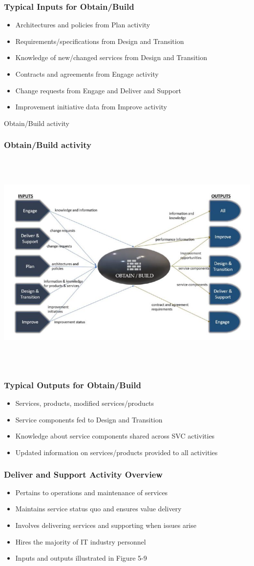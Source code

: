 \documentclass[aspectratio=169, table]{beamer}
\begin{document}
\begin{frame}
	\frametitle{Typical Inputs for Obtain/Build}
	\begin{itemize}
		\item Architectures and policies from Plan activity
		\item Requirements/specifications from Design and Transition
		\item Knowledge of new/changed services from Design and Transition
		\item Contracts and agreements from Engage activity
		\item Change requests from Engage and Deliver and Support
		\item Improvement initiative data from Improve activity
	\end{itemize}
\end{frame}

\begin{frame}{Obtain/Build activity} 	 \frametitle{Obtain/Build activity } \begin{center} 	\includegraphics[width=0.6\linewidth]{images/image-07.png} \end{center} \end{frame}

\begin{frame}
	\frametitle{Typical Outputs for Obtain/Build}
	\begin{itemize}
		\item Services, products, modified services/products
		\item Service components fed to Design and Transition
		\item Knowledge about service components shared across SVC activities
		\item Updated information on services/products provided to all activities
	\end{itemize}
\end{frame}

\begin{frame}
	\frametitle{Deliver and Support Activity Overview}
	\begin{itemize}
		\item Pertains to operations and maintenance of services
		\item Maintains service status quo and ensures value delivery
		\item Involves delivering services and supporting when issues arise
		\item Hires the majority of IT industry personnel
		\item Inputs and outputs illustrated in Figure 5-9
	\end{itemize}
\end{frame}
\end{document}
